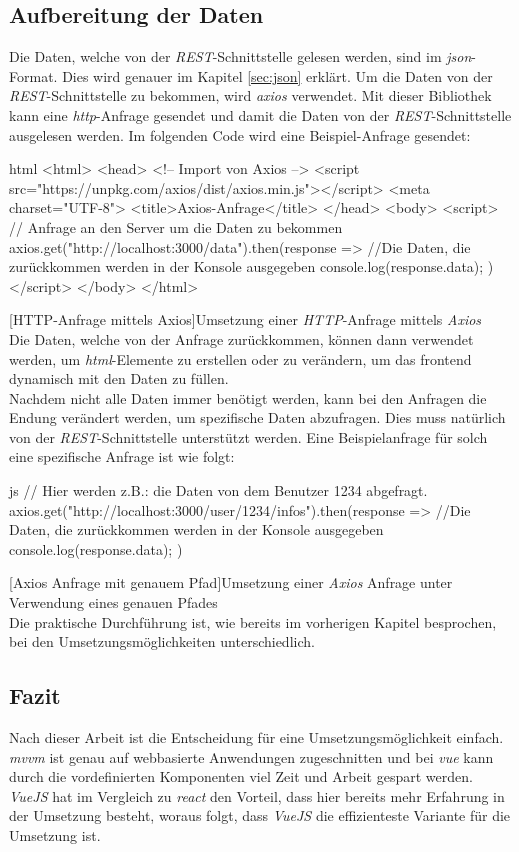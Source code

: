 \subsection{Aufbereitung der Daten}
Die Daten, welche von der \textit{REST}-Schnittstelle gelesen werden, sind im \textit{\Gls{json}}-Format. Dies wird genauer im Kapitel \autoref{sec:json} erklärt. Um die Daten von der \textit{REST}-Schnittstelle zu bekommen, wird \textit{\Gls{axios}} verwendet. Mit dieser Bibliothek kann eine \textit{\Gls{http}}-Anfrage gesendet und damit die Daten von der \textit{REST}-Schnittstelle ausgelesen werden. Im folgenden Code wird eine Beispiel-Anfrage gesendet:
\begin{code}{html}
	<html>
		<head>
			<!-- Import von Axios -->
			<script src="https://unpkg.com/axios/dist/axios.min.js"></script>
			<meta charset="UTF-8">
			<title>Axios-Anfrage</title>
		</head>
		<body>
			<script>
				// Anfrage an den Server um die Daten zu bekommen
				axios.get("http://localhost:3000/data").then(response => {
					//Die Daten, die zurückkommen werden in der Konsole ausgegeben
					console.log(response.data);
				})
			</script>
		</body>
	</html>
\end{code}
[HTTP-Anfrage mittels Axios]{Umsetzung einer \textit{HTTP}-Anfrage mittels \textit{Axios}}~\\
Die Daten, welche von der Anfrage zurückkommen, können dann verwendet werden, um \textit{\Gls{html}}-Elemente zu erstellen oder zu verändern, um das \Gls{frontend} dynamisch mit den Daten zu füllen.\\Nachdem nicht alle Daten immer benötigt werden, kann bei den Anfragen die Endung verändert werden, um spezifische Daten abzufragen. Dies muss natürlich von der \textit{REST}-Schnittstelle unterstützt werden. Eine Beispielanfrage für solch eine spezifische Anfrage ist wie folgt:
\begin{code}{js}
	// Hier werden z.B.: die Daten von dem Benutzer 1234 abgefragt.
	axios.get("http://localhost:3000/user/1234/infos").then(response => {
		//Die Daten, die zurückkommen werden in der Konsole ausgegeben
		console.log(response.data);
	})
\end{code}
[Axios Anfrage mit genauem Pfad]{Umsetzung einer \textit{Axios} Anfrage unter Verwendung eines genauen Pfades}~\\
Die praktische Durchführung ist, wie bereits im vorherigen Kapitel besprochen, bei den Umsetzungsmöglichkeiten unterschiedlich.
\subsection{Fazit}
\label{sec:rfoster_fazit}
Nach dieser Arbeit ist die Entscheidung für eine Umsetzungsmöglichkeit einfach. \textit{\Gls{mvvm}} ist genau auf webbasierte Anwendungen zugeschnitten und bei \textit{\Gls{vue}} kann durch die vordefinierten Komponenten viel Zeit und Arbeit gespart werden. \textit{VueJS} hat im Vergleich zu \textit{\Gls{react}} den Vorteil, dass hier bereits mehr Erfahrung in der Umsetzung besteht, woraus folgt, dass \textit{VueJS} die effizienteste Variante für die Umsetzung ist.